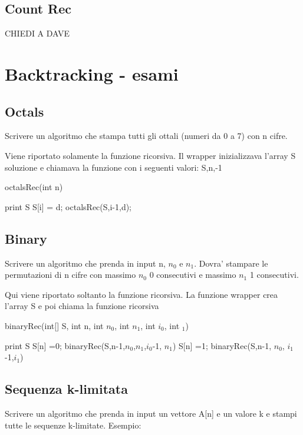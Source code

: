 \documentclass[oneside]{book}
\begin{document}
\section{Count Rec}

CHIEDI A DAVE


\chapter{Backtracking - esami}
\section{Octals}
Scrivere un algoritmo che stampa tutti gli ottali (numeri da 0 a 7) con n cifre.

Viene riportato solamente la funzione ricorsiva. Il wrapper inizializzava l'array S soluzione e chiamava la funzione con i seguenti valori: S,n,-1

\begin{algorithm}
\caption{octalsRec(int n)\label{alg:cap}}
\begin{algorithmic}
	\State print S
\Else
			\State S[i] = d;
			\State octalsRec(S,i-1,d);
		\EndIf
	\EndFor
\EndIf

\end{algorithmic}
\end{algorithm}

\newpage
\section{Binary}
Scrivere un algoritmo che prenda in input n, $n_0$ e $n_1$. Dovra' stampare le permutazioni di n cifre con massimo $n_0$ 0 consecutivi e massimo $n_1$ 1 consecutivi. 

Qui viene riportato soltanto la funzione ricorsiva. La funzione wrapper crea l'array S e poi chiama la funzione ricorsiva 
\begin{algorithm}
\caption{binaryRec(int[] S, int n, int $n_0$, int $n_1$, int $i_0$, int $_1$)}
\begin{algorithmic}
	\State print S
\EndIf
{}
	\State S[n] =0;
	\State binaryRec(S,n-1,$n_0$,$n_1$,$i_0$-1, $n_1$)
\EndIf
{}
	\State S[n] =1;
	\State binaryRec(S,n-1, $n_0$, $i_1$-1,$i_1$)
\EndIf	
\end{algorithmic}
\end{algorithm}
\newpage
\section{Sequenza k-limitata}
Scrivere un algoritmo che prenda in input un vettore A[n] e un valore k e stampi tutte le sequenze k-limitate. Esempio: 
\end{document}
